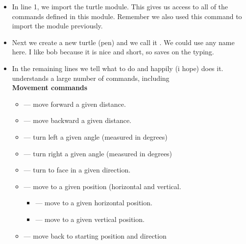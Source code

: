 \documentclass{coderdojo}
\begin{document}
\begin{itemize}
\item[\pointSymbol]
 In line 1, we import the turtle module. This gives us access to all of the commands defined in this module. Remember we also used this command to import the  module previously.
\item[\pointSymbol]
Next we create a new turtle (pen) and we call it . We could use any name here. I like bob because it is nice and short, so saves on the typing.
 
\item[\pointSymbol]
In the remaining lines we tell  what to do and  happily (i hope) does it.
 understands a large number of commands, including\\

{\bfseries\color{section} Movement commands}
\begin{itemize}
\item {} --- move forward a given distance.
\item {} --- move backward a given distance.
\item {} --- turn left a given angle (measured in degrees)
\item {} --- turn right a given angle (measured in degrees)
\item {} --- turn to face in a given direction.
\item {} --- move to a given position (horizontal and vertical.
\begin{itemize}
\item {} --- move to a given horizontal position.
\item {} --- move to a given vertical position.
\end{itemize}
\item {} --- move back to starting position and direction
\end{itemize}


\end{itemize}
\end{document}
